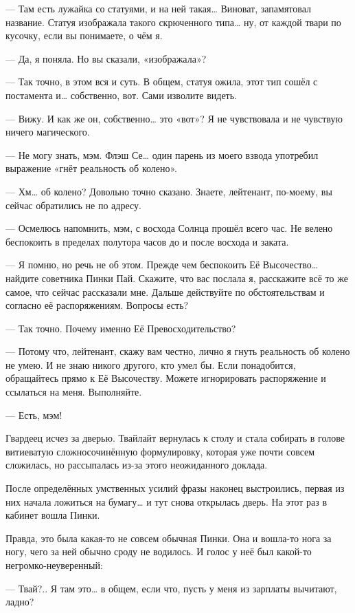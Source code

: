 \documentclass[twoside,a5paper,12pt]{extbook}
\begin{document}
— Там есть лужайка со статуями, и на ней такая… Виноват, запамятовал название. Статуя изображала такого скрюченного типа… ну, от каждой твари по кусочку, если вы понимаете, о чём я.

— Да, я поняла. Но вы сказали, «изображала»?

— Так точно, в этом вся и суть. В общем, статуя ожила, этот тип сошёл с постамента и… собственно, вот. Сами изволите видеть.

— Вижу. И как же он, собственно… это «вот»? Я не чувствовала и не чувствую ничего магического.

— Не могу знать, мэм. Флэш Се… один парень из моего взвода употребил выражение «гнёт реальность об колено».

— Хм… об колено? Довольно точно сказано. Знаете, лейтенант, по-моему, вы сейчас обратились не по адресу.

— Осмелюсь напомнить, мэм, с восхода Солнца прошёл всего час. Не велено беспокоить в пределах полутора часов до и после восхода и заката.

— Я помню, но речь не об этом. Прежде чем беспокоить Её Высочество… найдите советника Пинки Пай. Скажите, что вас послала я, расскажите всё то же самое, что сейчас рассказали мне. Дальше действуйте по обстоятельствам и согласно её распоряжениям. Вопросы есть?

— Так точно. Почему именно Её Превосходительство?

— Потому что, лейтенант, скажу вам честно, лично я гнуть реальность об колено не умею. И не знаю никого другого, кто умел бы. Если понадобится, обращайтесь прямо к Её Высочеству. Можете игнорировать распоряжение и ссылаться на меня. Выполняйте.

— Есть, мэм!

Гвардеец исчез за дверью. Твайлайт вернулась к столу и стала собирать в голове витиеватую сложносочинённую формулировку, которая уже почти совсем сложилась, но рассыпалась из-за этого неожиданного доклада.

После определённых умственных усилий фразы наконец выстроились, первая из них начала ложиться на бумагу… и тут снова открылась дверь. На этот раз в кабинет вошла Пинки.

Правда, это была какая-то не совсем обычная Пинки. Она и вошла-то нога за ногу, чего за ней обычно сроду не водилось. И голос у неё был какой-то негромко-неуверенный:

— Твай?.. Я там это… в общем, если что, пусть у меня из зарплаты вычитают, ладно?
\end{document}
